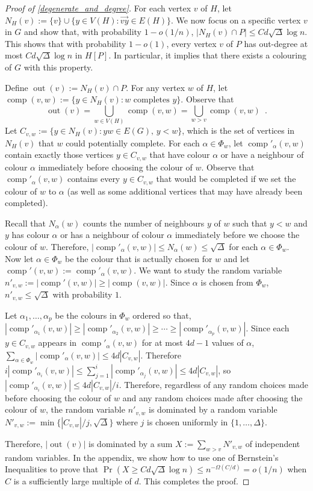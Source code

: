 \documentclass{patmorin}
\DeclareMathOperator{\outn}{out}
\DeclareMathOperator{\comp}{comp}
\begin{document}
\begin{proof}[Proof of \cref{degenerate_and_degree}]
  For each vertex $v$ of $H$, let $N_H(v):=\{v\}\cup \{y\in V(H): \overrightarrow{vy}\in E(H)\}$.  We now focus on a specific vertex $v$ in $G$ and show that, with probability $1-o(1/n)$, $|N_H(v)\cap P|\le Cd\sqrt{\Delta}\log  n$.  This shows that with probability $1-o(1)$, every vertex $v$ of $P$ has out-degree at most $Cd\sqrt{\Delta}\log n$ in $H[P]$.  In particular, it implies that there exists a colouring of $G$ with this property.

   Define $\outn(v):=N_H(v)\cap P$. For any vertex $w$ of $H$, let $\comp(v,w):=\{y\in N_H(v):\text{$w$ completes $y$}\}$.  Observe that
  \[
    \outn(v) = \bigcup_{w\in V(H)} \comp(v,w) = \bigcup_{w>v} \comp(v,w) \enspace .
  \]
  Let $C_{v,w}:=\{y\in N_H(v): yw\in E(G),\, y < w\}$, which is the set of vertices in $N_H(v)$ that $w$ could potentially complete.  For each $\alpha\in\Phi_w$, let $\comp'_\alpha(v,w)$ contain exactly those vertices $y\in C_{v,w}$ that have colour $\alpha$ or have a neighbour of colour $\alpha$ immediately before choosing the colour of $w$.  Observe that $\comp'_\alpha(v,w)$ contains every $y\in C_{v,w}$ that would be completed if we set the colour of $w$ to $\alpha$ (as well as some additional vertices that may have already been completed).

  Recall that $N_\alpha(w)$ counts the number of neighbours $y$ of $w$ such that $y < w$ and $y$ has colour $\alpha$ or has a neighbour of colour $\alpha$ immediately before we choose the colour of $w$.  Therefore,  $|\comp'_\alpha(v,w)|\le N_\alpha(w)\le \sqrt{\Delta}$ for each $\alpha\in\Phi_w$.  Now let $\alpha\in\Phi_w$ be the colour that is actually chosen for $w$ and let $\comp'(v,w):=\comp'_\alpha(v,w)$.  We want to study the random variable $n'_{v,w}:=|\comp'(v,w)|\ge |\comp(v,w)|$.  Since $\alpha$ is chosen from $\Phi_w$, $n'_{v,w}\le\sqrt{\Delta}$ with probability $1$.

  Let $\alpha_1,\ldots,\alpha_p$ be the colours in $\Phi_w$ ordered so that, $|\comp'_{\alpha_1}(v,w)|\ge|\comp'_{\alpha_2}(v,w)|\ge\cdots\ge |\comp'_{\alpha_p}(v,w)|$.  Since each $y\in C_{v,w}$ appears in
  $\comp'_{\alpha}(v,w)$ for at most $4d-1$ values of $\alpha$,  $\sum_{\alpha\in\Phi_w} |\comp'_{\alpha}(v,w)| \le 4d| C_{v,w}|$.
  Therefore $i|\comp'_{\alpha_i}(v,w)|\le\sum_{j=1}^i|\comp'_{\alpha_j}(v,w)|\le 4d|C_{v,w}|$, so $|\comp'_{\alpha_i}(v,w)|\le 4d|C_{v,w}|/i$.    Therefore, regardless of any random choices made before choosing the colour of $w$ and any random choices made after choosing the colour of $w$, the random variable $n'_{v,w}$ is dominated by a random variable $N'_{v,w}:=\min\{|C_{v,w}|/j,\sqrt{\Delta}\}$ where $j$ is chosen uniformly in $\{1,\ldots,\Delta\}$.

  Therefore, $|\outn(v)|$ is dominated by a sum $X:=\sum_{w> v} N'_{v,w}$ of independent random variables.  In the appendix, we show how to use one of Bernstein's Inequalities to prove that $\Pr\left(X\ge Cd\sqrt{\Delta}\log  n\right)\le n^{-\Omega(C/d)} = o(1/n)$ when $C$ is a sufficiently large multiple of $d$.  This completes the proof.
\end{proof}
\end{document}
